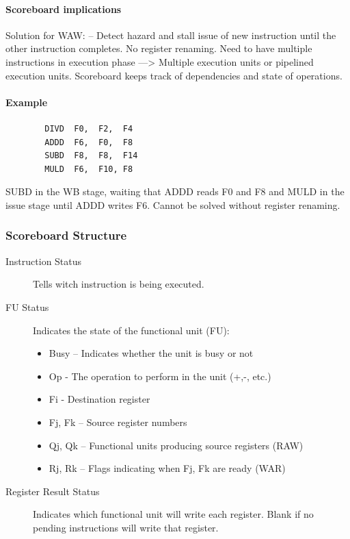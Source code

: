 \paragraph{Scoreboard implications}
Solution for WAW:
    – Detect hazard and stall issue of new instruction until the other instruction completes.
No register renaming.
Need to have multiple instructions in execution
phase ---> Multiple execution units or pipelined
execution units.
Scoreboard keeps track of dependencies and
state of operations.

\paragraph{Example}
\begin{center}
    \begin{verbatim}
        DIVD  F0,  F2,  F4
        ADDD  F6,  F0,  F8
        SUBD  F8,  F8,  F14
        MULD  F6,  F10, F8
    \end{verbatim}
\end{center}
SUBD in the WB stage, waiting that ADDD reads F0 and F8 and MULD in the issue stage until ADDD writes F6. Cannot be
solved without register renaming.\\

\subsubsection{Scoreboard Structure}\label{subsubsec:scoreboard-structure}
\begin{description}
    \item[Instruction Status] Tells witch instruction is being executed.
    \item[FU Status] Indicates the state of the functional unit (FU):
    \begin{itemize}[noitemsep]
        \item[] Busy – Indicates whether the unit is busy or not
        \item[] Op - The operation to perform in the unit (+,-, etc.)
        \item[] Fi - Destination register
        \item[] Fj, Fk – Source register numbers
        \item[] Qj, Qk – Functional units producing source registers (RAW)
        \item[] Rj, Rk – Flags indicating when Fj, Fk are ready (WAR)
    \end{itemize}
    \item[Register Result Status] Indicates which functional unit will write each register.
Blank if no pending instructions will write that register.
\end{description}

